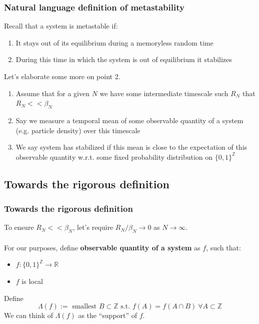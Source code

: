 \documentclass{beamer}
\begin{document}
\begin{frame}
    \frametitle{Natural language definition of metastability}

    Recall that a system is metastable if:
    \begin{enumerate}
        \item It stays out of its equilibrium during a memoryless random time
        \item During this time in which the system is out of equilibrium it stabilizes
    \end{enumerate}
    Let's elaborate some more on point 2.
    \begin{enumerate}
        \item Assume that for a given $N$ we have some intermediate timescale such $R_N$ that $R_N << \beta_N$
        \item Say we measure a temporal mean of some observable quantity of a system (e.g. particle density) over this timescale
        \item We say system has stabilized if this mean is close to the expectation of this observable quantity w.r.t. some fixed probability distribution on $\{0,1\}^{\mathbb{Z}}$
    \end{enumerate}
\end{frame}

\subsection{Towards the rigorous definition} %

\begin{frame}
    \frametitle{Towards the rigorous definition}
    To ensure $R_N << \beta_N$, let's require $R_N / \beta_N \rightarrow 0$ as $N \rightarrow \infty$.
    \\~\\ 
    For our purposes, define \textbf{observable quantity of a system} as $f$, such that:
    \begin{itemize}
        \item $f : \{0,1\}^{\mathbb{Z}} \rightarrow \mathbb{R}$
        \item $f$ is local
    \end{itemize}
    Define 
    \[
        \Lambda(f) :=  \text{ smallest } B\subset \mathbb{Z} \text{ s.t. } f(A) = f(A\cap B) \ \forall A \subset \mathbb{Z}
    \]
    We can think of $\Lambda(f)$ as the ``support'' of $f$.
\end{frame}
\end{document}
